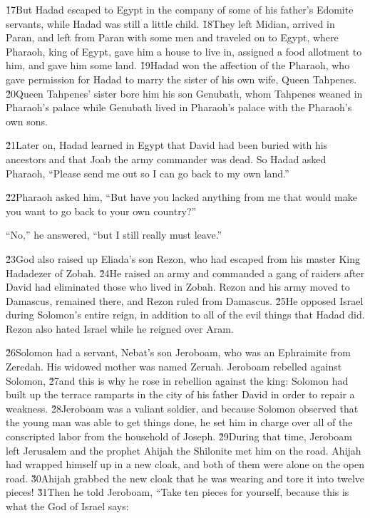 \v{17}But Hadad escaped to Egypt in the company of some of his father's Edomite servants, while Hadad was still a little child. \v{18}They left Midian, arrived in Paran, and left from Paran with some men and traveled on to Egypt, where Pharaoh, king of Egypt, gave him a house to live in, assigned a food allotment to him, and gave him some land. \v{19}Hadad won the affection of the Pharaoh, who gave permission for Hadad to marry the sister of his own wife, Queen Tahpenes. \v{20}Queen Tahpenes' sister bore him his son Genubath, whom Tahpenes weaned in Pharaoh's palace while Genubath lived in Pharaoh's palace with the Pharaoh's own sons.

\v{21}Later on, Hadad learned in Egypt that David had been buried with his ancestors and that Joab the army commander was dead. So Hadad asked Pharaoh, ``Please send me out so I can go back to my own land.''

\v{22}Pharaoh asked him, ``But have you lacked anything from me that would make you want to go back to your own country?''

``No,'' he answered, ``but I still really must leave.''

\v{23}God also raised up Eliada's son Rezon, who had escaped from his master King Hadadezer of Zobah. \v{24}He raised an army and commanded a gang of raiders after David had eliminated those who lived in Zobah. Rezon and his army moved to Damascus, remained there, and Rezon ruled from Damascus. \v{25}He opposed Israel during Solomon's entire reign, in addition to all of the evil things that Hadad did. Rezon also hated Israel while he reigned over Aram.

\v{26}Solomon had a servant, Nebat's son Jeroboam, who was an Ephraimite from Zeredah. His widowed mother was named Zeruah. Jeroboam rebelled against Solomon, \v{27}and this is why he rose in rebellion against the king: Solomon had built up the terrace ramparts in the city of his father David in order to repair a weakness. \v{28}Jeroboam was a valiant soldier, and because Solomon observed that the young man was able to get things done, he set him in charge over all of the conscripted labor from the household of Joseph. \v{29}During that time, Jeroboam left Jerusalem and the prophet Ahijah the Shilonite met him on the road. Ahijah had wrapped himself up in a new cloak, and both of them were alone on the open road. \v{30}Ahijah grabbed the new cloak that he was wearing and tore it into twelve pieces! \v{31}Then he told Jeroboam, ``Take ten pieces for yourself, because this is what the  God of Israel says:

